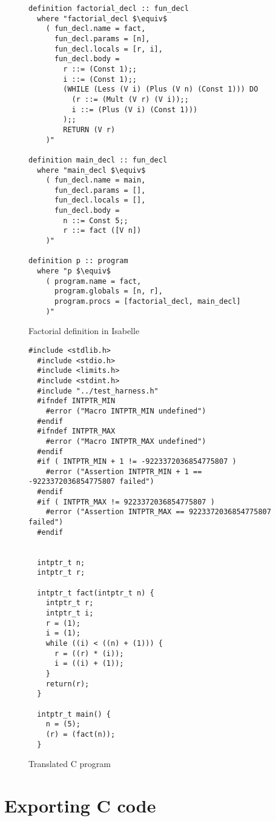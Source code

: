 \begin{figure}
\begin{lstlisting}[mathescape=true]
 definition factorial_decl :: fun_decl
  where "factorial_decl $\equiv$
    ( fun_decl.name = fact,
      fun_decl.params = [n],
      fun_decl.locals = [r, i],
      fun_decl.body = 
        r ::= (Const 1);;
        i ::= (Const 1);;
        (WHILE (Less (V i) (Plus (V n) (Const 1))) DO
          (r ::= (Mult (V r) (V i));;
          i ::= (Plus (V i) (Const 1)))
        );;
        RETURN (V r)
    )"

definition main_decl :: fun_decl
  where "main_decl $\equiv$
    ( fun_decl.name = main,
      fun_decl.params = [],
      fun_decl.locals = [],
      fun_decl.body = 
        n ::= Const 5;;
        r ::= fact ([V n])
    )"

definition p :: program
  where "p $\equiv$ 
    ( program.name = fact,
      program.globals = [n, r],
      program.procs = [factorial_decl, main_decl]
    )" 
\end{lstlisting}
\caption{Factorial definition in Isabelle}
\label{fig:factorial_isabelle}
\end{figure}


\begin{figure}
\begin{lstlisting}[mathescape=true]
  #include <stdlib.h>
  #include <stdio.h>
  #include <limits.h>
  #include <stdint.h>
  #include "../test_harness.h"
  #ifndef INTPTR_MIN
    #error ("Macro INTPTR_MIN undefined")
  #endif
  #ifndef INTPTR_MAX
    #error ("Macro INTPTR_MAX undefined")
  #endif
  #if ( INTPTR_MIN + 1 != -9223372036854775807 )
    #error ("Assertion INTPTR_MIN + 1 == -9223372036854775807 failed")
  #endif
  #if ( INTPTR_MAX != 9223372036854775807 )
    #error ("Assertion INTPTR_MAX == 9223372036854775807 failed")
  #endif
  
  
  intptr_t n;
  intptr_t r;
  
  intptr_t fact(intptr_t n) {
    intptr_t r;
    intptr_t i;
    r = (1);
    i = (1);
    while ((i) < ((n) + (1))) {
      r = ((r) * (i));
      i = ((i) + (1));
    }
    return(r);
  }
  
  intptr_t main() {
    n = (5);
    (r) = (fact(n));
  }
\end{lstlisting}
\caption{Translated C program}
\label{fig:factorial_c}
\end{figure}

\section{Exporting C code}

